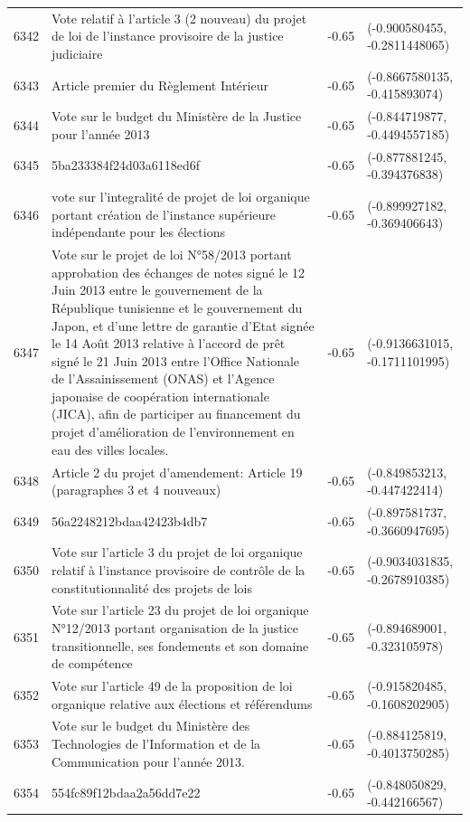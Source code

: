 \begin{table}[ht]
\begin{tabular}{rlrl}
  6342 & Vote relatif à l'article 3 (2 nouveau) du projet de loi de l'instance provisoire de la justice judiciaire & -0.65 & (-0.900580455, -0.2811448065) \\ 
  6343 & Article premier du Règlement Intérieur & -0.65 & (-0.8667580135, -0.415893074) \\ 
  6344 & Vote sur le  budget du Ministère de la Justice pour l'année 2013 & -0.65 & (-0.844719877, -0.4494557185) \\ 
  6345 & 5ba233384f24d03a6118ed6f & -0.65 & (-0.877881245, -0.394376838) \\ 
  6346 & vote sur l'integralité de  projet de loi organique portant création de l'instance supérieure indépendante pour les élections & -0.65 & (-0.899927182, -0.369406643) \\ 
  6347 & Vote sur le projet de loi N°58/2013 portant approbation des échanges de notes signé le 12 Juin 2013 entre le gouvernement de la République tunisienne et le gouvernement du Japon, et d'une lettre de garantie d'Etat signée le 14 Août 2013 relative à l'accord de prêt signé le 21 Juin 2013 entre l'Office Nationale de l'Assainissement (ONAS) et l'Agence japonaise de coopération internationale (JICA), afin de participer au financement du projet d'amélioration de l'environnement en eau des villes locales. & -0.65 & (-0.9136631015, -0.1711101995) \\ 
  6348 & Article 2 du projet d'amendement: Article 19 (paragraphes 3 et 4 nouveaux) & -0.65 & (-0.849853213, -0.447422414) \\ 
  6349 & 56a2248212bdaa42423b4db7 & -0.65 & (-0.897581737, -0.3660947695) \\ 
  6350 & Vote sur l'article 3 du projet de loi organique relatif à l'instance provisoire de contrôle de la constitutionnalité des projets de lois & -0.65 & (-0.9034031835, -0.2678910385) \\ 
  6351 & Vote sur l'article 23 du projet de loi organique N°12/2013 portant organisation de la justice transitionnelle, ses fondements et son domaine de compétence & -0.65 & (-0.894689001, -0.323105978) \\ 
  6352 & Vote sur l'article 49 de la proposition de loi organique relative aux élections et référendums & -0.65 & (-0.915820485, -0.1608202905) \\ 
  6353 & Vote sur le budget du Ministère des Technologies de l'Information et de la Communication pour l'année 2013. & -0.65 & (-0.884125819, -0.4013750285) \\ 
  6354 & 554fc89f12bdaa2a56dd7e22 & -0.65 & (-0.848050829, -0.442166567) \\ 

\end{tabular}
\end{table}
